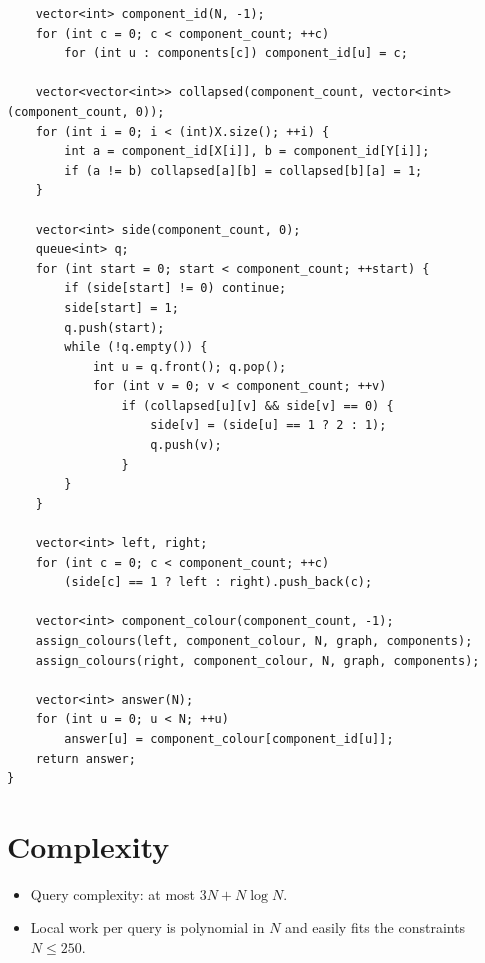 \documentclass[11pt,a4paper]{article}
\begin{document}
\begin{lstlisting}
    vector<int> component_id(N, -1);
    for (int c = 0; c < component_count; ++c)
        for (int u : components[c]) component_id[u] = c;

    vector<vector<int>> collapsed(component_count, vector<int>(component_count, 0));
    for (int i = 0; i < (int)X.size(); ++i) {
        int a = component_id[X[i]], b = component_id[Y[i]];
        if (a != b) collapsed[a][b] = collapsed[b][a] = 1;
    }

    vector<int> side(component_count, 0);
    queue<int> q;
    for (int start = 0; start < component_count; ++start) {
        if (side[start] != 0) continue;
        side[start] = 1;
        q.push(start);
        while (!q.empty()) {
            int u = q.front(); q.pop();
            for (int v = 0; v < component_count; ++v)
                if (collapsed[u][v] && side[v] == 0) {
                    side[v] = (side[u] == 1 ? 2 : 1);
                    q.push(v);
                }
        }
    }

    vector<int> left, right;
    for (int c = 0; c < component_count; ++c)
        (side[c] == 1 ? left : right).push_back(c);

    vector<int> component_colour(component_count, -1);
    assign_colours(left, component_colour, N, graph, components);
    assign_colours(right, component_colour, N, graph, components);

    vector<int> answer(N);
    for (int u = 0; u < N; ++u)
        answer[u] = component_colour[component_id[u]];
    return answer;
}
\end{lstlisting}

\section{Complexity}
\begin{itemize}
  \item Query complexity: at most $3N + N \log N$.
  \item Local work per query is polynomial in $N$ and easily fits the constraints $N \le 250$.
\end{itemize}
\end{document}
